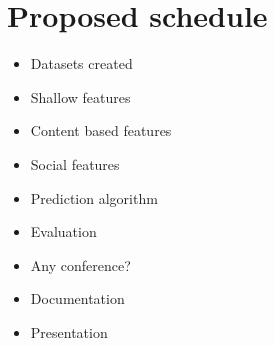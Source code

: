 \documentclass[12pt]{article}
\begin{document}
\section{Proposed schedule}
\begin{itemize}
\item Datasets created
\item Shallow features 
\item Content based features
\item Social features
\item Prediction algorithm
\item Evaluation
\item Any conference?
\item Documentation
\item Presentation
\end{itemize}
{}

\end{document}
